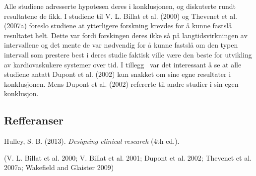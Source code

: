 \documentclass[
]{article}
\begin{document}
Alle studiene adresserte hypotesen deres i konklusjonen, og diskuterte
rundt resultatene de fikk. I studiene til V. L. Billat et al. (2000) og
Thevenet et al. (2007a) foreslo studiene at ytterligere forskning
krevdes for å kunne fastslå resultatet helt. Dette var fordi forskingen
deres ikke så på langtidsvirkningen av intervallene og det mente de var
nødvendig for å kunne fastslå om den typen intervall som prestere best i
deres studie faktisk ville være den beste for utvikling av
kardiovaskulære systemer over tid. I tillegg ~var det interessant å se
at alle studiene antatt Dupont et al. (2002) kun snakket om sine egne
resultater i konklusjonen. Mens Dupont et al. (2002) refererte til andre
studier i sin egen konklusjon.

\hypertarget{refferanser}{%
\subsection{Refferanser}\label{refferanser}}

Hulley, S. B. (2013). \emph{Designing clinical research} (4th ed.).

(V. L. Billat et al. 2000; V. Billat et al. 2001; Dupont et al. 2002;
Thevenet et al. 2007a; Wakefield and Glaister 2009)
\end{document}
